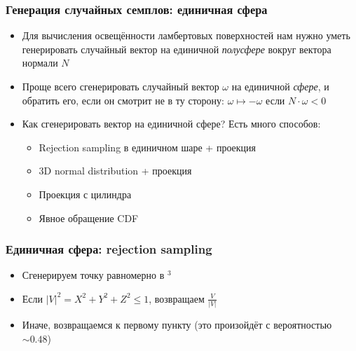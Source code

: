 \documentclass[handout,10pt]{beamer}
\begin{document}
\begin{frame}[fragile]
\frametitle{Генерация случайных семплов: единичная сфера}
\begin{itemize}
\item Для вычисления освещённости ламбертовых поверхностей нам нужно уметь генерировать случайный вектор на единичной \textit{полусфере} вокруг вектора нормали \begin{math}N\end{math}
\pause
\item Проще всего сгенерировать случайный вектор \begin{math}\omega\end{math} на единичной \textit{сфере}, и обратить его, если он смотрит не в ту сторону: \begin{math}\omega \mapsto -\omega\end{math} если \begin{math}N\cdot \omega < 0\end{math}
\pause
\item Как сгенерировать вектор на единичной сфере? \pause Есть много способов:
\begin{itemize}
\item Rejection sampling в единичном шаре + проекция
\item 3D normal distribution + проекция
\item Проекция с цилиндра
\item Явное обращение CDF
\end{itemize}
\end{itemize}
\end{frame}

\begin{frame}[fragile]
\frametitle{Единичная сфера: rejection sampling}
\begin{itemize}
\item Сгенерируем точку равномерно в \begin{math}[-1,1]^3\end{math}
\pause
\item Если \begin{math}|V|^2 = X^2+Y^2+Z^2\leq 1\end{math}, возвращаем \begin{math}\frac{V}{|V|}\end{math}
\pause
\item Иначе, возвращаемся к первому пункту (это произойдёт с вероятностью \begin{math}\sim0.48\end{math})
\end{itemize}
\end{frame}
\end{document}
